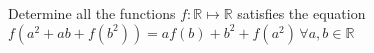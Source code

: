 Determine all the functions $f:\mathbb R\mapsto\mathbb R$ satisfies the equation
$f(a^2 +ab+ f(b^2))=af(b)+b^2+ f(a^2)\,\forall a,b\in\mathbb R $